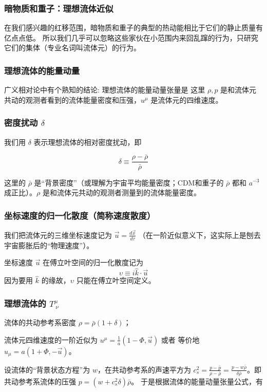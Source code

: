 \documentclass[CJK,13pt]{beamer}
\begin{document}
   \begin{frame}
    \frametitle{暗物质和重子：理想流体近似}
    在我们感兴趣的红移范围，暗物质和重子的典型的热动能相比于它们的静止质量有亿点点低。 所以我们几乎可以忽略这些家伙在小范围内来回乱蹿的行为，只研究它们的集体（专业名词叫流体元）的行为。

    \bcenter
        
    \ecenter

  \end{frame}


   \begin{frame}
     \frametitle{理想流体的能量动量}
     广义相对论中有个熟知的结论: 理想流体的能量动量张量是
     这里 $\rho, p$ 是和流体元共动的观测者看到的流体能量密度和压强，$u^\mu$ 是流体元的四维速度。
   \end{frame}


  \begin{frame}
    \frametitle{密度扰动 $\delta$}
    我们用 $\delta$ 表示理想流体的相对密度扰动，即

    {\blue $$\delta\equiv \frac{\rho - \bar{\rho}}{\bar{\rho}}$$}

    这里的 $\bar{\rho}$ 是“背景密度”（或理解为宇宙平均能量密度；CDM和重子的 $\bar{\rho}$ 都和 $a^{-3}$ 成正比）。$\rho$ 是和流体元共动的观测者测量到的流体能量密度。


  \end{frame}


  \begin{frame}
    \frametitle{坐标速度的归一化散度（简称速度散度）}
    我们把流体元的三维坐标速度记为 $\vec{u} = \frac{d\vec{x}}{d\tau}$ （在一阶近似意义下，这实际上是刨去宇宙膨胀后的“物理速度”）。

    坐标速度 $\vec{u}$ 在傅立叶空间的归一化散度记为
    {\blue $$\upsilon  \equiv i\hat{k} \cdot \vec{u}$$}
     因为要用 $\hat{k}$ 的缘故，$\upsilon$ 只能在傅立叶空间定义。

  \end{frame}


    \begin{frame}
    \frametitle{理想流体的 $T^\mu_{\ \nu}$}
    \bitem
    \item{流体的共动参考系密度  $\rho = \bar{\rho}(1+\delta)$；}
    \item{ 流体元四维速度的一阶近似为 $u^\mu = \frac{1}{a} (1-\Phi, \vec{u})$ 或者 等价地 $u_\mu = a(1+\Phi, -\vec{u})$。}
    \item{设流体的“背景状态方程”为 $w$，在共动参考系的声速平方为 $c_s^2 = \frac{p-\bar{p}}{\rho-\bar{\rho}}=\frac{p-w\bar{\rho}}{\delta \bar{\rho}}$。即共动参考系流体的压强 $p  = (w + c_s^2\delta)\bar{\rho}$。}
      \eitem
      于是根据流体的能量动量张量公式，有
     
  \end{frame}
  
\end{document}
